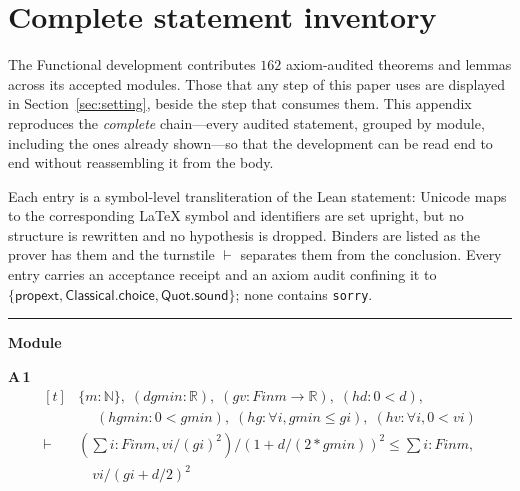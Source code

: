 \appendices
\section{Complete statement inventory}
\label{app:inventory}

The Functional development contributes $162$ axiom-audited theorems and lemmas across its accepted modules. Those that any step of this paper uses are displayed in Section~\ref{sec:setting}, beside the step that consumes them. This appendix reproduces the \emph{complete} chain---every audited statement, grouped by module, including the ones already shown---so that the development can be read end to end without reassembling it from the body.

Each entry is a symbol-level transliteration of the Lean statement: Unicode maps to the corresponding \LaTeX{} symbol and identifiers are set upright, but no structure is rewritten and no hypothesis is dropped. Binders are listed as the prover has them and the turnstile $\vdash$ separates them from the conclusion. Every entry carries an acceptance receipt and an axiom audit confining it to $\{\textsf{propext},\textsf{Classical.choice},\textsf{Quot.sound}\}$; none contains \texttt{sorry}.

\vspace{4pt}\noindent\rule{\columnwidth}{0.4pt}\par\vspace{2pt}
\noindent\textbf{Module }\par\vspace{3pt}

\noindent\textbf{A\,1}\quad{}
{\footnotesize\[ \begin{aligned}[t]
&\{ \mathit{m} : \mathbb{N} \},\; (\mathit{d} \mathit{gmin} : \mathbb{R} ),\; (\mathit{g} \mathit{v} : \mathit{Fin} \mathit{m} \to \mathbb{R} ),\; (\mathit{hd} : 0 < \mathit{d}),\\
&\quad \; (\mathit{hgmin} : 0 < \mathit{gmin}),\; (\mathit{hg} : \forall \mathit{i}, \mathit{gmin} \leq \mathit{g} \mathit{i}),\; (\mathit{hv} : \forall \mathit{i}, 0 < \mathit{v} \mathit{i})\\
\vdash\;&(\textstyle\sum \mathit{i} : \mathit{Fin} \mathit{m}, \mathit{v} \mathit{i} / (\mathit{g} \mathit{i}) ^{2}) / (1 + \mathit{d} / (2 * \mathit{gmin})) ^{2} \leq \textstyle\sum \mathit{i} : \mathit{Fin} \mathit{m},\\
&\quad \mathit{v} \mathit{i} / (\mathit{g} \mathit{i} + \mathit{d} / 2) ^{2}
\end{aligned} \]}

